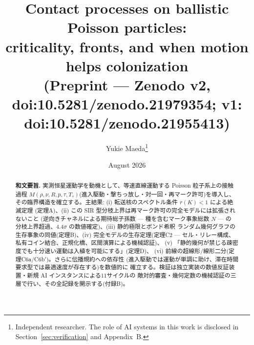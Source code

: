 \documentclass[11pt]{article}
\title{Contact processes on ballistic Poisson particles:\\
criticality, fronts, and when motion helps colonization\\[1ex]
\large (Preprint --- Zenodo v2, doi:10.5281/zenodo.21979354; v1: doi:10.5281/zenodo.21955413)}
\author{Yukie Maeda\thanks{Independent researcher. The role of AI systems in this
work is disclosed in Section~\ref{sec:verification} and Appendix~B.}}
\date{August 2026}
\newcommand{\Ts}{T_s}
\begin{document}
\maketitle

\begin{abstract}
\noindent\textbf{和文要旨.}
実測恒星運動学を動機として、等速直線運動する Poisson 粒子系上の接触過程
$M(\rho,\nu,R,p,\tau,\Ts)$(進入駆動・撃ちっ放し・対一回・再マーク許可)を導入し、
その臨界構造を確立する。主結果: (i) 転送核のスペクトル条件 $r(K)<1$ による絶滅定理
(定理A)、(ii) この SIR 型分枝上界は再マーク許可の完全モデルには拡張されないこと
(逆向きチャネルによる期待総子孫数 --- 種を含むマーク事象総数 $N$ --- の
分枝上界超過、$4.4\sigma$ の数値確定)、(iii) 静的極限とボンド希釈
ランダム幾何グラフの生存事象の同値(定理B)、(iv) 完全モデルの生存定理(定理C2 ---
セル・リレー構成、私有コイン結合、正規化橋、区間演算による機械認証)、
(v) 「静的幾何が禁じる疎密度でも十分速い運動は入植を可能にする」(定理D)、
(vi) 前線の超線形/線形二分(定理C6a/C6b$'$)。さらに伝播規約への依存性
(進入駆動では運動が単調に助け、滞在時間要求型では最適速度が存在する)を数値的に
確立する。検証は独立実装の数値反証装置・新規 AI インスタンスによる11サイクルの
敵対的審査・幾何定数の機械認証の三層で行い、その全記録を開示する(付録B)。


\end{abstract}
\end{document}
